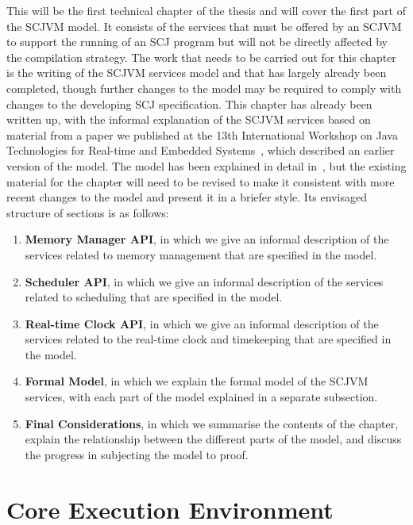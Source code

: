 \documentclass[a4paper,10pt]{report}
\let\olditem\item
\renewcommand{\item}[1][]{\olditem{\bfseries #1}}
\begin{document}
This will be the first technical chapter of the thesis and will cover
the first part of the SCJVM model.
It consists of the services that must be offered by an SCJVM to
support the running of an SCJ program but will not be directly
affected by the compilation strategy.
The work that needs to be carried out for this chapter is the writing
of the SCJVM services model and that has largely already been
completed, though further changes to the model may be required to
comply with changes to the developing SCJ specification.
This chapter has already been written up, with the informal
explanation of the SCJVM services based on material from a paper we
published at the 13th International Workshop on Java Technologies for
Real-time and Embedded Systems~\cite{baxter2015a}, which described an
earlier version of the model.
The model has been explained in detail
in~\cite{baxter2016draftthesis}, but the existing material for the
chapter will need to be revised to make it consistent with more recent
changes to the model and present it in a briefer style.
Its envisaged structure of sections is as follows:
\begin{enumerate}
\item[Memory Manager API], in which we give an informal description of
  the services related to memory management that are specified in the
  model.
\item[Scheduler API], in which we give an informal description of the
  services related to scheduling that are specified in the model.
\item[Real-time Clock API], in which we give an informal description
  of the services related to the real-time clock and timekeeping that
  are specified in the model.
\item[Formal Model], in which we explain the formal model of the SCJVM
  services, with each part of the model explained in a separate
  subsection.
\item[Final Considerations], in which we summarise the contents of the
  chapter, explain the relationship between the different parts of the
  model, and discuss the progress in subjecting the model to proof.
\end{enumerate} 

\section{Core Execution Environment}
\end{document}
